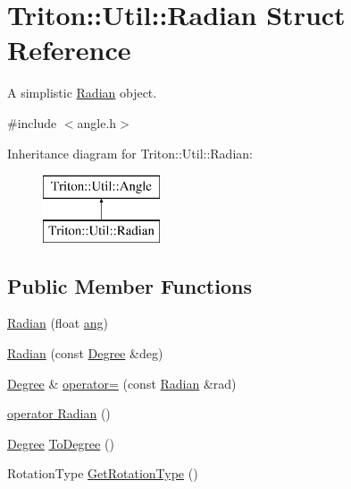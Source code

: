 \hypertarget{struct_triton_1_1_util_1_1_radian}{}\section{Triton\+:\+:Util\+:\+:Radian Struct Reference}
\label{struct_triton_1_1_util_1_1_radian}


A simplistic \hyperlink{struct_triton_1_1_util_1_1_radian}{Radian} object.  




{\ttfamily \#include $<$angle.\+h$>$}

Inheritance diagram for Triton\+:\+:Util\+:\+:Radian\+:\begin{figure}[H]
\begin{center}
\leavevmode
\includegraphics[height=2.000000cm]{struct_triton_1_1_util_1_1_radian}
\end{center}
\end{figure}
\subsection*{Public Member Functions}
\begin{DoxyCompactItemize}
\item 
\hyperlink{struct_triton_1_1_util_1_1_radian_a8a3742b1fea5004220873adc6d437d7c}{Radian} (float \hyperlink{struct_triton_1_1_util_1_1_angle_af7d7f20a28c150b09776a35bc1dae0c4}{ang})
\item 
\hyperlink{struct_triton_1_1_util_1_1_radian_a8f9ab085fc95a855c92cbafb25e6afd8}{Radian} (const \hyperlink{struct_triton_1_1_util_1_1_degree}{Degree} \&deg)
\item 
\hyperlink{struct_triton_1_1_util_1_1_degree}{Degree} \& \hyperlink{struct_triton_1_1_util_1_1_radian_aae924a8168ac832c6cccea1a37254f3b}{operator=} (const \hyperlink{struct_triton_1_1_util_1_1_radian}{Radian} \&rad)
\item 
\hyperlink{struct_triton_1_1_util_1_1_radian_a2ee78bac3381aa4c8bfd8eb92309a104}{operator Radian} ()
\item 
\hyperlink{struct_triton_1_1_util_1_1_degree}{Degree} \hyperlink{struct_triton_1_1_util_1_1_radian_a9c0762747497079361565baf13b098d4}{To\+Degree} ()
\item 
Rotation\+Type \hyperlink{struct_triton_1_1_util_1_1_radian_a75a4253af1ecb0bd75240fc604b8c61b}{Get\+Rotation\+Type} ()
\end{DoxyCompactItemize}
